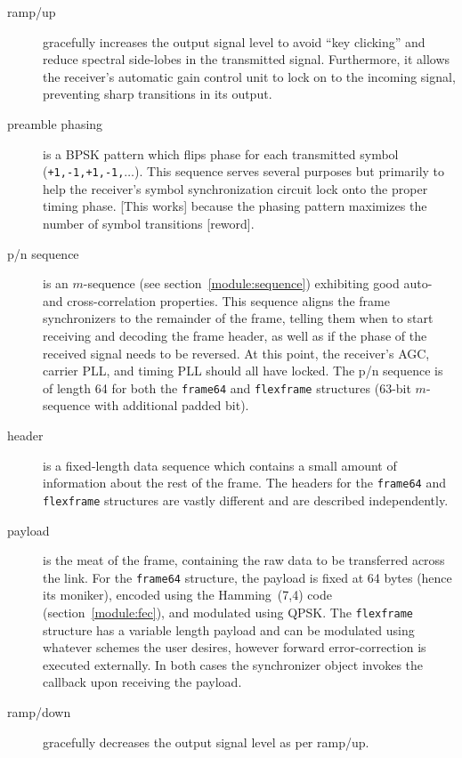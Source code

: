 \begin{description}
\item[{\sf ramp/up}]
    gracefully increases the output signal level to avoid ``key clicking'' and
    reduce spectral side-lobes in the transmitted signal.
    Furthermore, it allows the receiver's automatic gain control unit to
    lock on to the incoming signal, preventing sharp transitions in its
    output.
\item[{\sf preamble phasing}]
    is a BPSK pattern which flips phase for each transmitted symbol
    ({\tt +1,-1,+1,-1,$\ldots$}).
    This sequence serves several purposes but primarily to help the receiver's
    symbol synchronization circuit lock onto the proper timing phase.
    [This works] because the phasing pattern maximizes the number of symbol
    transitions [reword].
\item[{\sf p/n sequence}]
    is an $m$-sequence (see section~\ref{module:sequence}) exhibiting good
    auto- and cross-correlation properties.
    This sequence aligns the frame synchronizers to the remainder of the
    frame, telling them when to start receiving and decoding the frame header,
    as well as if the phase of the received signal needs to be reversed.
    At this point, the receiver's AGC, carrier PLL, and timing PLL should all
    have locked.
    The p/n sequence is of length 64 for both the {\tt frame64} and
    {\tt flexframe} structures (63-bit $m$-sequence with additional padded
    bit).
\item[{\sf header}]
    is a fixed-length data sequence which contains a small amount of
    information about the rest of the frame.
    The headers for the {\tt frame64} and {\tt flexframe} structures are
    vastly different and are described independently.
\item[{\sf payload}]
    is the meat of the frame, containing the raw data to be transferred across
    the link.
    For the {\tt frame64} structure, the payload is fixed at 64 bytes (hence
    its moniker), encoded using the Hamming~(7,4) code
    (section~\ref{module:fec}), and modulated using QPSK.
    The {\tt flexframe} structure has a variable length payload and can be
    modulated using whatever schemes the user desires, however forward
    error-correction is executed externally.
    In both cases the synchronizer object invokes the callback upon receiving
    the payload.
\item[{\sf ramp/down}]
    gracefully decreases the output signal level as per ramp/up.
\end{description}

